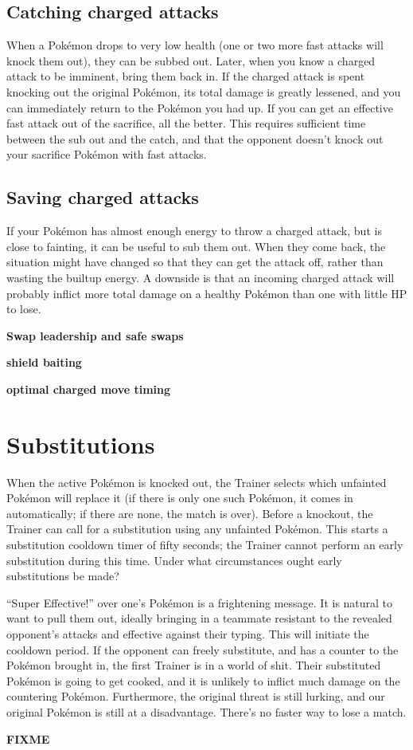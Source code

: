 \subsection{Catching charged attacks}
When a Pokémon drops to very low health (one or two more fast attacks will knock
 them out), they can be subbed out.
Later, when you know a charged attack to be imminent, bring them back in.
If the charged attack is spent knocking out the original Pokémon, its total
 damage is greatly lessened, and you can immediately return to the Pokémon
 you had up.
If you can get an effective fast attack out of the sacrifice, all the better.
This requires sufficient time between the sub out and the catch, and that the
 opponent doesn't knock out your sacrifice Pokémon with fast attacks.

\subsection{Saving charged attacks}
If your Pokémon has almost enough energy to throw a charged attack, but is close to fainting, it can be useful to sub them out.
When they come back, the situation might have changed so that they can get the attack off,
 rather than wasting the builtup energy.
A downside is that an incoming charged attack will probably inflict more total
 damage on a healthy Pokémon than one with little HP to lose.

\textbf{Swap leadership and safe swaps}

\textbf{shield baiting}

\textbf{optimal charged move timing}

\section{Substitutions}
\label{sec:substitutions}
When the active Pokémon is knocked out, the Trainer selects which unfainted
  Pokémon will replace it (if there is only one such Pokémon, it comes in
  automatically; if there are none, the match is over).
Before a knockout, the Trainer can call for a substitution using any
  unfainted Pokémon.
This starts a substitution cooldown timer of fifty seconds; the Trainer
  cannot perform an early substitution during this time.
Under what circumstances ought early substitutions be made?

``Super Effective!'' over one's Pokémon is a frightening message.
It is natural to want to pull them out, ideally bringing in a teammate resistant
  to the revealed opponent's attacks and effective against their typing.
This will initiate the cooldown period.
If the opponent can freely substitute, and has a counter to the Pokémon brought in,
  the first Trainer is in a world of shit.
Their substituted Pokémon is going to get cooked, and it
 is unlikely to inflict much damage on the countering Pokémon.
Furthermore, the original threat is still lurking, and our original Pokémon is still at a disadvantage.
There's no faster way to lose a match.

\textbf{FIXME}
